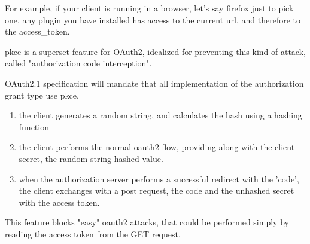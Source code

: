 For example, if your client is running in a browser, let's say firefox just to
pick one, any plugin you have installed has access to the current url, and
therefore to the access\_token.

\ac{pkce} is a superset feature for OAuth2, idealized for preventing this kind of
attack, called "authorization code interception".

OAuth2.1 specification will mandate that all implementation of the authorization
grant type use \ac{pkce}.

\begin{enumerate}
    \item the client generates a random string, and calculates the hash using a
        hashing function
    \item the client performs the normal oauth2 flow, providing along with the
        client secret, the random string hashed value.
    \item when the authorization server performs a successful redirect with the
        'code', the client exchanges with a post request, the code and the
        unhashed secret with the access token.
\end{enumerate}

This feature blocks "easy" oauth2 attacks, that could be performed simply by
reading the access token from the GET request.

